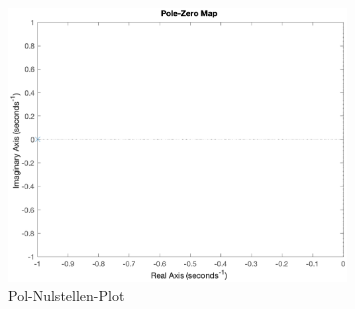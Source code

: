 \begin{figure}[H]
    \centering
    \includegraphics[width=0.8\textwidth]{Bilder/PoleZeroPT1Tt.eps}
    \caption{Pol-Nulstellen-Plot}
 \end{figure}

